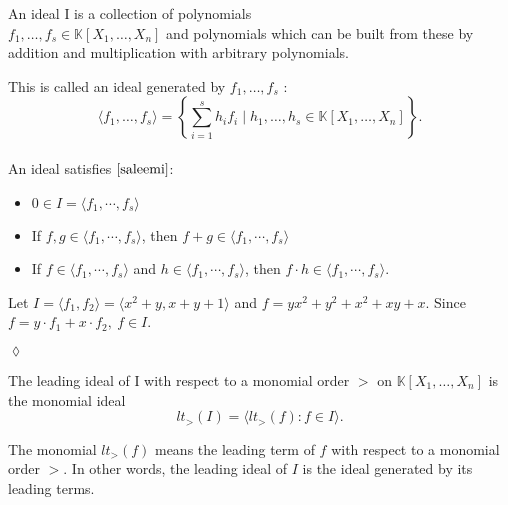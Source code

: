 \begin{env_definition}[Ideal]
\cite{KHZ}
An ideal I is a collection of polynomials \\ $f_{1},\dots ,f_{s} \in \mathbb{K}\left[X_{1}, \dots, X_{n}\right] $ and polynomials which can be built from these by addition and multiplication with arbitrary polynomials.

\end{env_definition}
This is called an ideal generated by $f_{1}, \dots , f_{s}$ : \\
\[ \langle f_{1}, \dots , f_{s} \rangle = \left\lbrace  \sum_{i=1}^s h_{i}f_{i} \mid h_{1}, \dots , h_{s} \in \mathbb{K}\left[X_{1}, \dots, X_{n}\right] \right\rbrace. \]
\\
An ideal satisfies $\cite{saleemi} $:
\begin{center}

\begin{itemize}
\item
$0 \in I = \langle f_{1}, \cdots , f_{s} \rangle$ 
\item
If $f,g \in \langle f_{1}, \cdots , f_{s} \rangle$, then  $f+g \in \langle f_{1}, \cdots , f_{s} \rangle$ 
\item
If $f \in \langle f_{1}, \cdots , f_{s} \rangle$ and $h \in  \langle f_{1}, \cdots , f_{s} \rangle$, then $f \cdot h \in \langle f_{1}, \cdots , f_{s} \rangle$.
\end{itemize}

\end{center}


\begin{env_example}\normalfont
Let $ I= \langle f_{1},f_{2} \rangle = \langle x^{2}+y, x+y+1 \rangle $ and $f=yx^{2}+y^{2}+x^{2}+xy+x$. Since $f= y \cdot f_{1} + x \cdot f_{2},~f\in I$.
\begin{flushright}
$\lozenge$
\end{flushright} 
\end{env_example}


\begin{env_definition}
\label{def:initial}
\cite{tigers} The leading ideal of I with respect to a monomial order $>$ on $\mathbb{K}\left[X_{1}, \dots, X_{n}\right]$ is the monomial ideal \\
\[lt_{>}(I) = \langle lt_{>}(f) : f \in I  \rangle . \]

\end{env_definition}
The monomial $lt_{>}(f)$ means the leading term of $f$ with respect to a monomial order $>$. In other words, the leading ideal of $I$ is the ideal generated by its leading terms.

